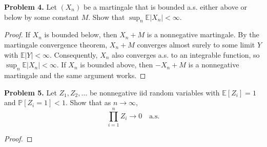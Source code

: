 \documentclass[11pt,letterpaper]{report}
\newcommand{\E}{\mathbb{E}}
\newcommand{\Prob}{\mathbb{P}}
\begin{document}
\noindent\textbf{Problem 4. }
Let $(X_n)$ be a martingale that is bounded a.s. either above or below by some constant $M$. Show that $\sup_n \E|X_n|<\infty$.
\begin{proof}
	If $X_n$ is bounded below, then $X_n+M$ is a nonnegative martingale. By the martingale convergence theorem, $X_n+M$ converges almost surely to some limit $Y$ with $\E|Y|<\infty$. Consequently, $X_n$ also converges a.s. to an integrable function, so $\sup_n \E|X_n|<\infty$. If $X_n$ is bounded above, then $-X_n+M$ is a nonnegative martingale and the same argument works.
\end{proof}

\noindent\textbf{Problem 5. }
Let $Z_1, Z_2, \ldots$ be nonnegative iid random variables with $\E[Z_i] = 1$ and $\Prob[Z_i = 1]<1$. Show that as $n\to \infty$,
\[
\prod_{i=1}^n Z_i\to 0\quad\text{a.s.}
\]
\begin{proof}
	
\end{proof}
\end{document}
